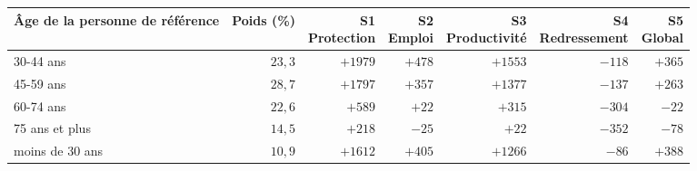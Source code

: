 \begin{tabular}{p{5cm}rrrrrr}\toprule Âge de la personne de référence & Poids (\%) & \makecell{S1\\Protection} & \makecell{S2\\Emploi} & \makecell{S3\\Productivité} & \makecell{S4\\Redressement} & \makecell{S5\\Global}\\ \midrule
30-44 ans & $23{,}3$ & $+1979$ & $+478$ & $+1553$ & $-118$ & $+365$\\
45-59 ans & $28{,}7$ & $+1797$ & $+357$ & $+1377$ & $-137$ & $+263$\\
60-74 ans & $22{,}6$ & $+589$ & $+22$ & $+315$ & $-304$ & $-22$\\
75 ans et plus & $14{,}5$ & $+218$ & $-25$ & $+22$ & $-352$ & $-78$\\
moins de 30 ans & $10{,}9$ & $+1612$ & $+405$ & $+1266$ & $-86$ & $+388$\\\bottomrule\end{tabular}